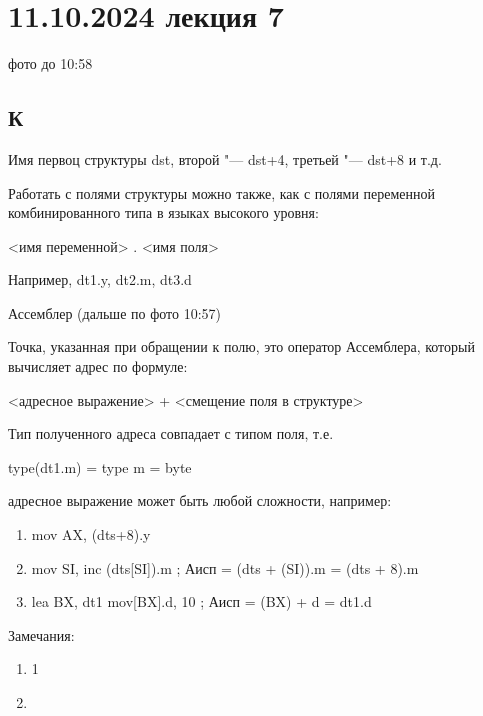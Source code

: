 \section{11.10.2024 лекция 7}
фото до 10:58
\subsection{К}
Имя первоц структуры dst, второй "--- dst+4, третьей "--- dst+8 и т.д.

Работать с полями структуры можно также, как с полями переменной комбинированного типа в языках высокого уровня:
\begin{center}
    <имя переменной> . <имя поля>
\end{center}
Например, dt1.y, dt2.m, dt3.d 

Ассемблер (дальше по фото 10:57)

Точка, указанная при обращении к полю, это оператор Ассемблера, который вычисляет адрес по формуле:
\begin{center}
    <адресное выражение> + <смещение поля в структуре>
\end{center}
Тип полученного адреса совпадает с типом поля, т.е.
\begin{center}
    type(dt1.m) = type m = byte
\end{center}
адресное выражение может быть любой сложности, например:
\begin{enumerate}
    \item mov AX, (dts+8).y
    \item mov SI,
    inc (dts[SI]).m ; Аисп = (dts + (SI)).m = (dts + 8).m
    \item lea BX, dt1
    mov[BX].d, 10   ; Аисп = (BX) + d = dt1.d
\end{enumerate}

Замечания:
\begin{enumerate}
    \item  1
    \item 
\end{enumerate}

